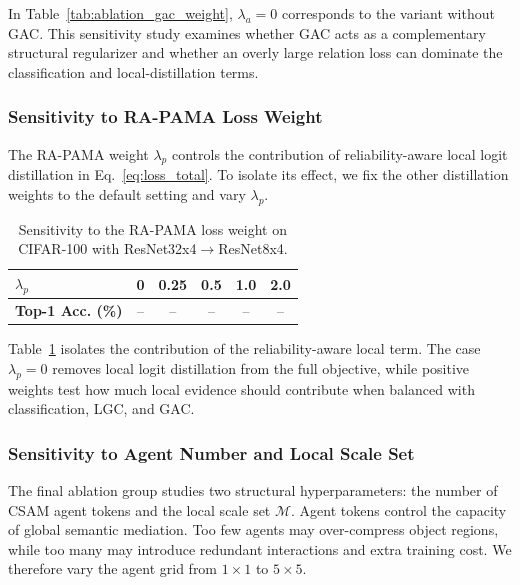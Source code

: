 \documentclass[a4paper,fleqn]{cas-dc}
\begin{document}
In Table~\ref{tab:ablation_gac_weight}, $\lambda_a=0$ corresponds to the
variant without GAC. This sensitivity study examines whether GAC acts as a
complementary structural regularizer and whether an overly large relation
loss can dominate the classification and local-distillation terms.

\subsubsection{Sensitivity to RA-PAMA Loss Weight}

The RA-PAMA weight $\lambda_p$ controls the contribution of reliability-aware
local logit distillation in Eq.~\eqref{eq:loss_total}. To isolate its effect,
we fix the other distillation weights to the default setting and vary
$\lambda_p$.

\begin{table}[pos=t]
\centering
\footnotesize
\caption{Sensitivity to the RA-PAMA loss weight on CIFAR-100 with ResNet32x4$\rightarrow$ResNet8x4.}
\label{tab:ablation_pama_weight}
\setlength{\tabcolsep}{4pt}
\renewcommand{\arraystretch}{1.08}
\begin{tabular*}{0.94\columnwidth}{@{\extracolsep{\fill}}lccccc}
\toprule
\textbf{$\lambda_p$} & 0 & 0.25 & 0.5 & 1.0 & 2.0 \\
\midrule
\textbf{Top-1 Acc. (\%)} & -- & -- & -- & -- & -- \\
\bottomrule
\end{tabular*}
\end{table}

Table~\ref{tab:ablation_pama_weight} isolates the contribution of the
reliability-aware local term. The case $\lambda_p=0$ removes local logit
distillation from the full objective, while positive weights test how much
local evidence should contribute when balanced with classification, LGC, and
GAC.

\subsubsection{Sensitivity to Agent Number and Local Scale Set}

The final ablation group studies two structural hyperparameters: the number
of CSAM agent tokens and the local scale set $\mathcal{M}$. Agent tokens
control the capacity of global semantic mediation. Too few agents may
over-compress object regions, while too many may introduce redundant
interactions and extra training cost. We therefore vary the agent grid from
$1\times1$ to $5\times5$.
\end{document}
